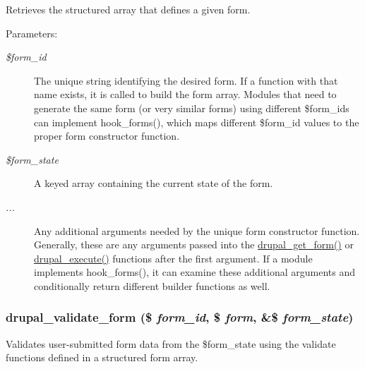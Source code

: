 Retrieves the structured array that defines a given form.

\begin{Desc}
\item[Parameters:]
\begin{description}
\item[{\em \$form\_\-id}]The unique string identifying the desired form. If a function with that name exists, it is called to build the form array. Modules that need to generate the same form (or very similar forms) using different \$form\_\-ids can implement hook\_\-forms(), which maps different \$form\_\-id values to the proper form constructor function. \item[{\em \$form\_\-state}]A keyed array containing the current state of the form. \item[{\em ...}]Any additional arguments needed by the unique form constructor function. Generally, these are any arguments passed into the \hyperlink{group__form__api_g720df81a837b06dfe19daf1c1eea3437}{drupal\_\-get\_\-form()} or \hyperlink{group__form__api_g06dfc84042a094ae6b40bc1840ccced8}{drupal\_\-execute()} functions after the first argument. If a module implements hook\_\-forms(), it can examine these additional arguments and conditionally return different builder functions as well. \end{description}
\end{Desc}
\hypertarget{group__form__api_gc650d688c949f726c59ab59e2d526ef8}{
\subsubsection[{drupal\_\-validate\_\-form}]{\setlength{\rightskip}{0pt plus 5cm}drupal\_\-validate\_\-form (\$ {\em form\_\-id}, \/  \$ {\em form}, \/  \&\$ {\em form\_\-state})}}
\label{group__form__api_gc650d688c949f726c59ab59e2d526ef8}


Validates user-submitted form data from the \$form\_\-state using the validate functions defined in a structured form array.

